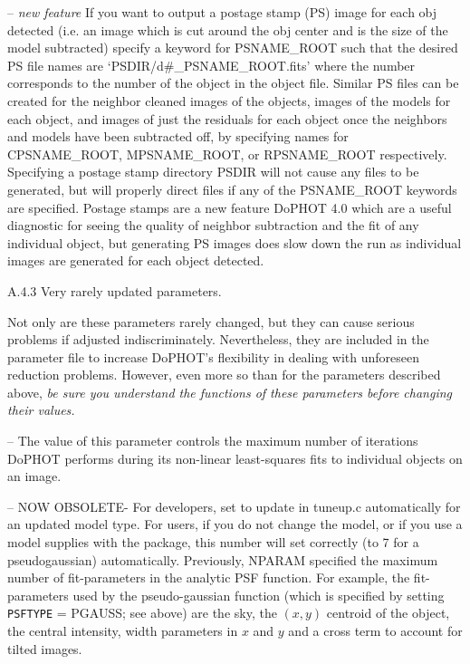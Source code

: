  -- {\it new feature} If you want to 
output a postage stamp (PS) image for each obj detected (i.e. an image 
which is cut around the obj center and is the size of the model subtracted) 
specify a keyword for PSNAME\_ROOT such that the desired PS file names 
are `PSDIR/d\#\_PSNAME\_ROOT.fits' 
where the number corresponds to the number of the object in the object 
file.  Similar PS files can be created for the neighbor cleaned images of 
the objects, images of the models for each object, and images of just the 
residuals for each object once the neighbors and models have been 
subtracted off, by 
specifying names for CPSNAME\_ROOT, MPSNAME\_ROOT, or 
RPSNAME\_ROOT respectively.  Specifying a postage stamp directory 
PSDIR will not cause any files to be generated, but will properly direct files 
if any of the PSNAME\_ROOT keywords are specified. Postage stamps are 
a new feature DoPHOT 4.0 which are a useful diagnostic for seeing the 
quality of neighbor subtraction and the fit of any individual object, but 
generating PS images does slow down the run as individual images are 
generated for each object detected.

\centerline{A.4.3  Very rarely updated parameters.}

Not only are these parameters rarely changed, but they can cause
serious problems if adjusted indiscriminately.  Nevertheless,
they are included in the parameter file to increase DoPHOT's
flexibility in dealing with unforeseen reduction problems.  
However, even more so than for the parameters described above,
{\it be sure you understand the functions of these parameters
before changing their values.}

 -- The value of this parameter controls
the maximum number of iterations DoPHOT performs during its
non-linear least-squares fits to individual objects on an
image.

 -- NOW OBSOLETE- For developers, set to update 
in tuneup.c automatically for an updated model type.  For users, if you do 
not change the model, or if you use a model supplies with the package, this 
number will set correctly (to 7 for a pseudogaussian) automatically. 
Previously, NPARAM specified the maximum 
number of fit-parameters in the analytic PSF function.  For example, the 
fit-parameters used by the pseudo-gaussian function (which is specified by 
setting {\tt PSFTYPE} = PGAUSS; see above) are the sky, the $(x,y)$ centroid 
of the object, the central intensity, width parameters in $x$ and $y$ and a
cross term to account for tilted images.

